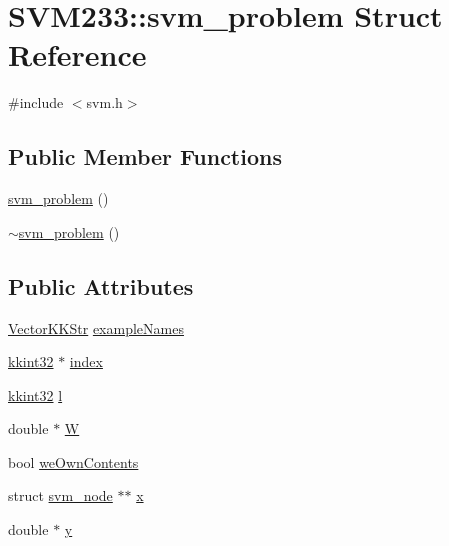 \hypertarget{struct_s_v_m233_1_1svm__problem}{}\section{S\+V\+M233\+:\+:svm\+\_\+problem Struct Reference}
\label{struct_s_v_m233_1_1svm__problem}


{\ttfamily \#include $<$svm.\+h$>$}

\subsection*{Public Member Functions}
\begin{DoxyCompactItemize}
\item 
\hyperlink{struct_s_v_m233_1_1svm__problem_a4f3af998238619c0390adcd4c2a80139}{svm\+\_\+problem} ()
\item 
\hyperlink{struct_s_v_m233_1_1svm__problem_ae7c2870921cad1e36cc62efb510a876c}{$\sim$svm\+\_\+problem} ()
\end{DoxyCompactItemize}
\subsection*{Public Attributes}
\begin{DoxyCompactItemize}
\item 
\hyperlink{class_k_k_b_1_1_vector_k_k_str}{Vector\+K\+K\+Str} \hyperlink{struct_s_v_m233_1_1svm__problem_a5d86ac405294437f5a2da3a0e90d7bd5}{example\+Names}
\item 
\hyperlink{namespace_k_k_b_a8fa4952cc84fda1de4bec1fbdd8d5b1b}{kkint32} $\ast$ \hyperlink{struct_s_v_m233_1_1svm__problem_a4769752a28a7f99fa469fed248762504}{index}
\item 
\hyperlink{namespace_k_k_b_a8fa4952cc84fda1de4bec1fbdd8d5b1b}{kkint32} \hyperlink{struct_s_v_m233_1_1svm__problem_a8e80c00adc45517f894b19ce879a0405}{l}
\item 
double $\ast$ \hyperlink{struct_s_v_m233_1_1svm__problem_a499ec12b246a796ab0951be8dab5cec5}{W}
\item 
bool \hyperlink{struct_s_v_m233_1_1svm__problem_a2ba090314d6e55344388630a2f10f655}{we\+Own\+Contents}
\item 
struct \hyperlink{struct_s_v_m233_1_1svm__node}{svm\+\_\+node} $\ast$$\ast$ \hyperlink{struct_s_v_m233_1_1svm__problem_a79a6083544d0f446a643167950c7e285}{x}
\item 
double $\ast$ \hyperlink{struct_s_v_m233_1_1svm__problem_a0883e07a3006cd2bb31eeb61c3a8c453}{y}
\end{DoxyCompactItemize}


